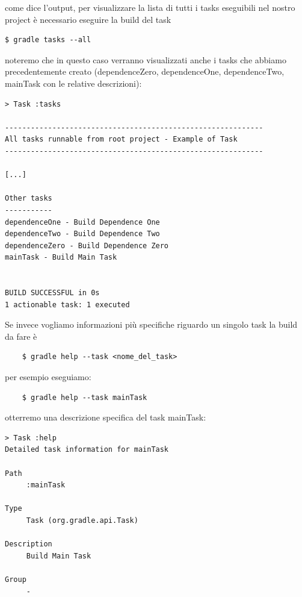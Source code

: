 come dice l'output, per visualizzare la lista di tutti i tasks eseguibili nel nostro project è necessario eseguire la build del task \begin{verbatim}$ gradle tasks --all \end{verbatim} noteremo che in questo caso verranno visualizzati anche i tasks che abbiamo precedentemente creato (dependenceZero, dependenceOne, dependenceTwo, mainTask con le relative descrizioni):
\begin{verbatim}
> Task :tasks 

------------------------------------------------------------
All tasks runnable from root project - Example of Task
------------------------------------------------------------

[...]

Other tasks
-----------
dependenceOne - Build Dependence One
dependenceTwo - Build Dependence Two
dependenceZero - Build Dependence Zero
mainTask - Build Main Task


BUILD SUCCESSFUL in 0s
1 actionable task: 1 executed
\end{verbatim}
Se invece vogliamo informazioni più specifiche riguardo un singolo task la build da fare è 
\begin{verbatim}
    $ gradle help --task <nome_del_task>\end{verbatim}
per esempio eseguiamo:
\begin{verbatim}
    $ gradle help --task mainTask\end{verbatim}
otterremo una descrizione specifica del task mainTask:
\begin{verbatim}
> Task :help 
Detailed task information for mainTask

Path
     :mainTask

Type
     Task (org.gradle.api.Task)

Description
     Build Main Task

Group
     -\end{verbatim}

